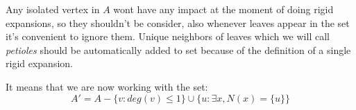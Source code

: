 Any isolated vertex in $A$ wont have any impact at the moment of doing rigid expansions, so they shouldn't be consider, also whenever leaves appear in the set it's convenient to ignore them. Unique neighbors of leaves which we will call \textit{petioles} should be automatically added to set because of the definition of a single rigid expansion.

It means that we are now working with the set:
$$A' = A - \{v: deg(v)\leq 1 \} \cup \{u: \exists x, N(x)=\{u\}\} $$

